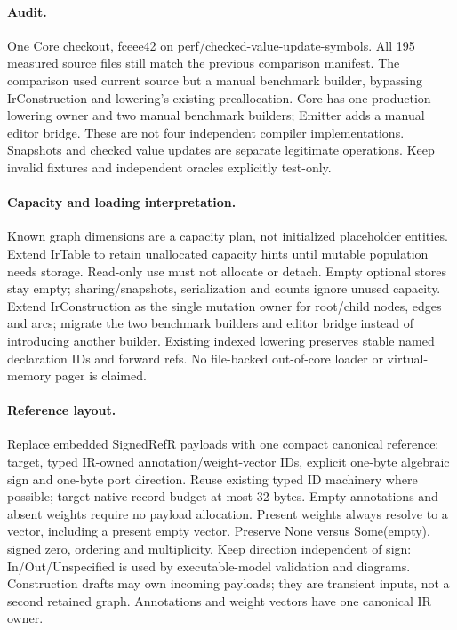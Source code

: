 \documentclass[11pt,a4paper]{article}
\begin{document}
\paragraph{Audit.} One Core checkout, fceee42 on perf/checked-value-update-symbols.
All 195 measured source files still match the previous comparison manifest. The
comparison used current source but a manual benchmark builder, bypassing
IrConstruction and lowering's existing preallocation. Core has one production
lowering owner and two manual benchmark builders; Emitter adds a manual editor
bridge. These are not four independent compiler implementations. Snapshots and
checked value updates are separate legitimate operations. Keep invalid fixtures
and independent oracles explicitly test-only.
\paragraph{Capacity and loading interpretation.} Known graph dimensions are a
capacity plan, not initialized placeholder entities. Extend IrTable to retain
unallocated capacity hints until mutable population needs storage. Read-only use
must not allocate or detach. Empty optional stores stay empty; sharing/snapshots,
serialization and counts ignore unused capacity. Extend IrConstruction as the
single mutation owner for root/child nodes, edges and arcs; migrate the two
benchmark builders and editor bridge instead of introducing another builder.
Existing indexed lowering preserves stable named declaration IDs and forward refs.
No file-backed out-of-core loader or virtual-memory pager is claimed.
\paragraph{Reference layout.} Replace embedded SignedRefR payloads with one compact
canonical reference: target, typed IR-owned annotation/weight-vector IDs, explicit
one-byte algebraic sign and one-byte port direction. Reuse existing typed ID
machinery where possible; target native record budget at most 32 bytes. Empty
annotations and absent weights require no payload allocation. Present weights
always resolve to a vector, including a present empty vector. Preserve None versus
Some(empty), signed zero, ordering and multiplicity. Keep direction independent
of sign: In/Out/Unspecified is used by executable-model validation and diagrams.
Construction drafts may own incoming payloads; they are transient inputs, not a
second retained graph. Annotations and weight vectors have one canonical IR owner.
\end{document}

